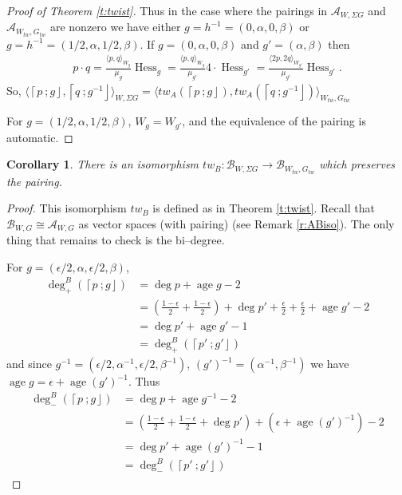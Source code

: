 \documentclass[10pt, letterpaper]{amsart}
\newtheorem{cor}[thm]{Corollary}
\theoremstyle{remark}
\newcommand{\sA}{\mathscr{A}}
\newcommand{\sB}{\mathscr{B}}
\newcommand{\fjrw}[2]{ \left\lceil #1 \:; #2 \right\rfloor }
\newcommand{\tw}[1]{{#1}_{tw}}
\newcommand{\s}[1]{\Sigma #1}
\newcommand{\ds}{\displaystyle}
\DeclareMathOperator{\Hess}{Hess}
\DeclareMathOperator{\age}{age}
\newcommand{\nathan}[1]{\todo[color=pistachio,fancyline]{N:#1}}
\begin{document}
\begin{proof}[Proof of Theorem \ref{t:twist}]
Thus in the case where the pairings in $\sA_{W,\s{G}}$ and $\sA_{\tw{W},\tw{G}}$ are nonzero we have either $g = h^{-1} = (0, \alpha, 0, \beta)$ or $g = h^{-1} = (1/2, \alpha, 1/2, \beta)$. If $g =(0,\alpha,0,\beta)$ and $g' = (\alpha,\beta)$ then
\[
\begin{array}{r}
\ds{p\cdot q = \frac{\langle p, q \rangle_{W_g}}{\mu_g} \Hess_g }
\ds{=\frac{\langle p, q \rangle_{W_g}}{\mu_{g'}} 4\cdot \Hess_{g'} }
\ds{=\frac{\langle 2 p, 2 q \rangle_{W_{g'}}}{\mu_{g'}}  \Hess_{g'} .}
\end{array}
\]
So, $\langle \fjrw{p}{g}, \fjrw{q}{g^{-1}}\rangle_{W,\s{G}} = \langle tw_A(\fjrw{p}{g}), tw_A(\fjrw{q}{g^{-1}} )\rangle_{\tw{W},\tw{G}}$

For $g = (1/2,\alpha, 1/2, \beta)$, $W_g = W_{g'}$, and the equivalence of the pairing is automatic.%
\end{proof}

\begin{cor}\label{c:Btwistiso}
There is an isomorphism $tw_B:\sB_{W,\s{G}}\to \sB_{\tw{W}, \tw{G}}$ which preserves the pairing. 
\end{cor}

\begin{proof}
This isomorphism $tw_B$ is defined as in Theorem \ref{t:twist}. Recall that $\sB_{W,G}\cong \sA_{W,G}$ as vector spaces (with pairing) (see Remark \ref{r:ABiso}). The only thing that remains to check is the bi--degree. 

For $g=(\epsilon/2,\alpha,\epsilon/2,\beta)$, 
\begin{align*}
\deg^B_+(\fjrw{p}{g}) &= \deg p + \age g - 2\\  
    &= (\tfrac{1-\epsilon}{2}+\tfrac{1-\epsilon}{2})+\deg p'+\tfrac{\epsilon}{2}+\tfrac{\epsilon}{2}+\age g'-2 \\
    &= \deg p'+\age g'-1\\
    &= \deg^B_+(\fjrw{p'}{g'})
\end{align*}
and since $g^{-1}=(\epsilon/2, \alpha^{-1}, \epsilon/2,\beta^{-1})$, $(g')^{-1}=(\alpha^{-1},\beta^{-1})$ we have $\age g= \epsilon + \age (g')^{-1}$. Thus 
\begin{align*}
\deg^B_-(\fjrw{p}{g}) &= \deg p + \age g^{-1} -2\\ 
    &= (\tfrac{1-\epsilon}{2}+\tfrac{1-\epsilon}{2}+\deg p')+(\epsilon+\age (g')^{-1})-2 \\
    &= \deg p'+\age (g')^{-1}-1\\
    &= \deg^B_-(\fjrw{p'}{g'})
\end{align*}
\end{proof}
\end{document}
